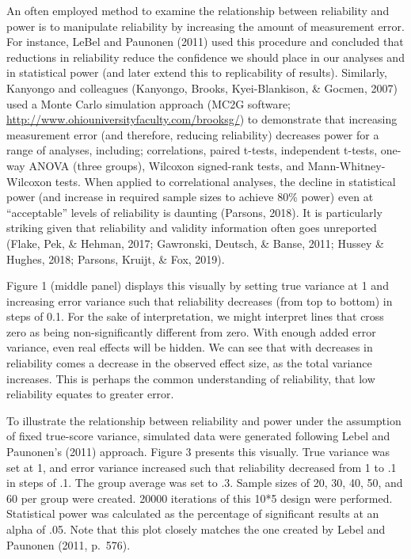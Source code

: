 \documentclass[english,,man]{apa6}
\begin{document}
An often employed method to examine the relationship between reliability and power is to manipulate reliability by increasing the amount of measurement error. For instance, LeBel and Paunonen (2011) used this procedure and concluded that reductions in reliability reduce the confidence we should place in our analyses and in statistical power (and later extend this to replicability of results). Similarly, Kanyongo and colleagues (Kanyongo, Brooks, Kyei-Blankison, \& Gocmen, 2007) used a Monte Carlo simulation approach (MC2G software; \url{http://www.ohiouniversityfaculty.com/brooksg/}) to demonstrate that increasing measurement error (and therefore, reducing reliability) decreases power for a range of analyses, including; correlations, paired t-tests, independent t-tests, one-way ANOVA (three groups), Wilcoxon signed-rank tests, and Mann-Whitney-Wilcoxon tests. When applied to correlational analyses, the decline in statistical power (and increase in required sample sizes to achieve 80\% power) even at \enquote{acceptable} levels of reliability is daunting (Parsons, 2018). It is particularly striking given that reliability and validity information often goes unreported (Flake, Pek, \& Hehman, 2017; Gawronski, Deutsch, \& Banse, 2011; Hussey \& Hughes, 2018; Parsons, Kruijt, \& Fox, 2019).

Figure 1 (middle panel) displays this visually by setting true variance at 1 and increasing error variance such that reliability decreases (from top to bottom) in steps of 0.1. For the sake of interpretation, we might interpret lines that cross zero as being non-significantly different from zero. With enough added error variance, even real effects will be hidden. We can see that with decreases in reliability comes a decrease in the observed effect size, as the total variance increases. This is perhaps the common understanding of reliability, that low reliability equates to greater error.

To illustrate the relationship between reliability and power under the assumption of fixed true-score variance, simulated data were generated following Lebel and Paunonen's (2011) approach. Figure 3 presents this visually. True variance was set at 1, and error variance increased such that reliability decreased from 1 to .1 in steps of .1. The group average was set to .3. Sample sizes of 20, 30, 40, 50, and 60 per group were created. 20000 iterations of this 10*5 design were performed. Statistical power was calculated as the percentage of significant results at an alpha of .05. Note that this plot closely matches the one created by Lebel and Paunonen (2011, p.~576).
\end{document}
